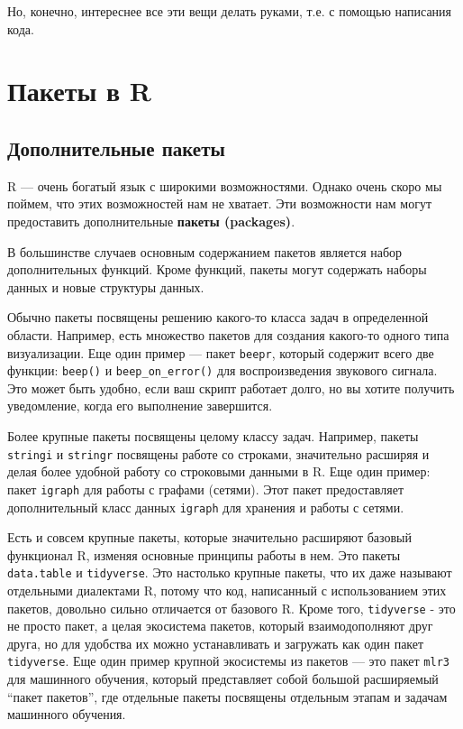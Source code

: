 \documentclass[]{book}
\begin{document}
Но, конечно, интереснее все эти вещи делать руками, т.е. с помощью
написания кода.

\chapter{Пакеты в R}\label{r_packages}

\section{Дополнительные пакеты}\label{extra_pack}

R --- очень богатый язык с широкими возможностями. Однако очень скоро мы
поймем, что этих возможностей нам не хватает. Эти возможности нам могут
предоставить дополнительные \textbf{пакеты (packages)}.

В большинстве случаев основным содержанием пакетов является набор
дополнительных функций. Кроме функций, пакеты могут содержать наборы
данных и новые структуры данных.

Обычно пакеты посвящены решению какого-то класса задач в определенной
области. Например, есть множество пакетов для создания какого-то одного
типа визуализации. Еще один пример --- пакет \texttt{beepr}, который
содержит всего две функции: \texttt{beep()} и \texttt{beep\_on\_error()}
для воспроизведения звукового сигнала. Это может быть удобно, если ваш
скрипт работает долго, но вы хотите получить уведомление, когда его
выполнение завершится.

Более крупные пакеты посвящены целому классу задач. Например, пакеты
\texttt{stringi} и \texttt{stringr} посвящены работе со строками,
значительно расширяя и делая более удобной работу со строковыми данными
в R. Еще один пример: пакет \texttt{igraph} для работы с графами
(сетями). Этот пакет предоставляет дополнительный класс данных
\texttt{igraph} для хранения и работы с сетями.

Есть и совсем крупные пакеты, которые значительно расширяют базовый
функционал R, изменяя основные принципы работы в нем. Это пакеты
\texttt{data.table} и \texttt{tidyverse}. Это настолько крупные пакеты,
что их даже называют отдельными диалектами R, потому что код, написанный
с использованием этих пакетов, довольно сильно отличается от базового R.
Кроме того, \texttt{tidyverse} - это не просто пакет, а целая экосистема
пакетов, который взаимодополняют друг друга, но для удобства их можно
устанавливать и загружать как один пакет \texttt{tidyverse}. Еще один
пример крупной экосистемы из пакетов --- это пакет \texttt{mlr3} для
машинного обучения, который представляет собой большой расширяемый
``пакет пакетов'', где отдельные пакеты посвящены отдельным этапам и
задачам машинного обучения.
\end{document}
